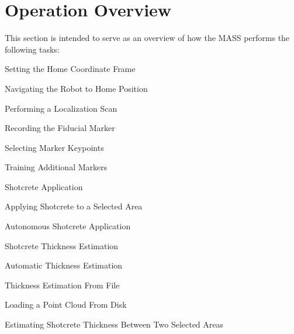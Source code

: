 \section{Operation Overview}
\label{sec:manual}
This section is intended to serve as an overview of how the MASS performs the following tasks:
\begin{myitemize}
\item Setting the Home Coordinate Frame
\begin{myitemize}
\item Navigating the Robot to Home Position
\item Performing a Localization Scan
\end{myitemize}
\item Recording the Fiducial Marker
\begin{myitemize}
\item Selecting Marker Keypoints
\item Training Additional Markers
\end{myitemize}
\item Shotcrete Application
\begin{myitemize}
\item Applying Shotcrete to a Selected Area
\item Autonomous Shotcrete Application
\end{myitemize}
\item Shotcrete Thickness Estimation
\begin{myitemize}
\item Automatic Thickness Estimation
\item Thickness Estimation From File
\item Loading a Point Cloud From Disk
\item Estimating Shotcrete Thickness Between Two Selected Areas
\end{myitemize}
\end{myitemize}
\newpage
